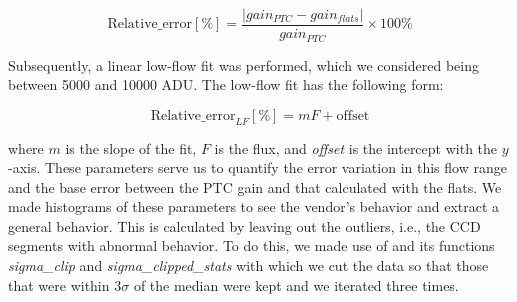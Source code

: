 \begin{equation}
    \mbox{Relative\_error} [\%] = \frac{|gain_{PTC} - gain_{flats}|}{gain_{PTC}} \times 100 \% 
    \label{eq:error_relativo_gain}
\end{equation}


Subsequently, a linear low-flow fit was performed, which we considered being between 5000 and 10000 ADU. The low-flow fit has the following form: 

\begin{equation}
    \mbox{Relative\_error}_{LF} [\%] = m F + \mbox{offset}
\end{equation}

where $m$ is the slope of the fit, $F$ is the flux, and  \textit{offset} is the intercept with the $y$-axis. These parameters serve us to quantify the error variation in this flow range and the base error between the PTC gain and that calculated with the flats. We made histograms of these parameters to see the vendor's behavior and extract a general behavior. This is calculated by leaving out the outliers, i.e., the CCD segments with abnormal behavior. To do this, we made use of \cite{price2018astropy} and its functions \textit{sigma\_clip} and \textit{sigma\_clipped\_stats} with which we cut the data so that those that were within $3 \sigma$ of the median were kept and we iterated three times. 



